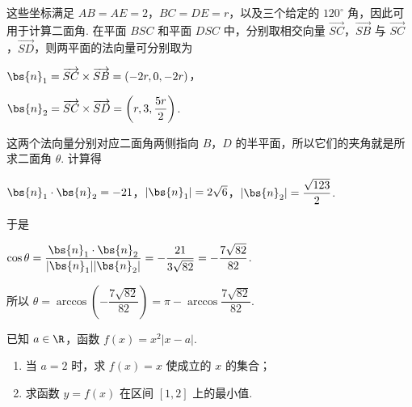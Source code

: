 \begin{solution}
\begin{enumerate}
这些坐标满足 \(AB=AE=2\)，\(BC=DE=r\)，以及三个给定的 \(120^{\circ}\) 角，因此可用于计算二面角. 在平面 \(BSC\) 和平面 \(DSC\) 中，分别取相交向量 \(\overrightarrow{SC}\)，\(\overrightarrow{SB}\) 与 \(\overrightarrow{SC}\)，\(\overrightarrow{SD}\)，则两平面的法向量可分别取为

\(\bs{n}_1=\overrightarrow{SC}\times\overrightarrow{SB}=(-2r,0,-2r)\)，

\(\bs{n}_2=\overrightarrow{SC}\times\overrightarrow{SD}=\left(r,3,\dfrac{5r}{2}\right)\).

这两个法向量分别对应二面角两侧指向 \(B\)，\(D\) 的半平面，所以它们的夹角就是所求二面角 \(\theta\). 计算得

\(\bs{n}_1\cdot\bs{n}_2=-21\)，\(|\bs{n}_1|=2\sqrt{6}\)，\(|\bs{n}_2|=\dfrac{\sqrt{123}}{2}\).

于是

\(\cos\theta=\dfrac{\bs{n}_1\cdot\bs{n}_2}{|\bs{n}_1||\bs{n}_2|}=-\dfrac{21}{3\sqrt{82}}=-\dfrac{7\sqrt{82}}{82}\).

所以 \(\theta=\arccos\left(-\dfrac{7\sqrt{82}}{82}\right)=\pi-\arccos\dfrac{7\sqrt{82}}{82}\).
\end{enumerate}
\end{solution}

\begin{problem}
已知 \(a \in \R\)，函数 \(f(x) = x^2 |x - a|\).
\begin{enumerate}
\item 当 \(a = 2\) 时，求 \(f(x) = x\) 使成立的 \(x\) 的集合；
\item 求函数 \(y = f(x)\) 在区间 \([1,2]\) 上的最小值.
\end{enumerate}
\end{problem}

